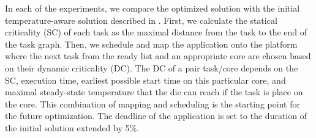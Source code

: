 In each of the experiments, we compare the optimized solution with the initial temperature-aware solution described in \cite{xie2006}. First, we calculate the statical criticality (SC) of each task as the maximal distance from the task to the end of the task graph. Then, we schedule and map the application onto the platform where the next task from the ready list and an appropriate core are chosen based on their dynamic criticality (DC). The DC of a pair task/core depends on the SC, execution time, earliest possible start time on this particular core, and maximal steady-state temperature that the die can reach if the task is place on the core. This combination of mapping and scheduling is the starting point for the future optimization. The deadline of the application is set to the duration of the initial solution extended by 5\%.

